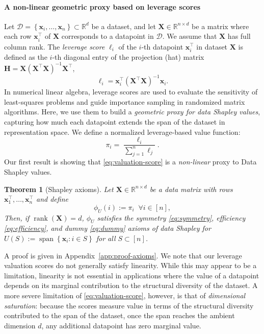 \documentclass{article}
\newtheorem{theorem}{Theorem}
\def\hmat{\mathbf{H}}
\def\xmat{\mathbf{X}}
\def\x{\mathbf{x}}
\def\dataset{\mathcal{D}}
\newcommand{\1}{\mathbbm{1}}
\DeclareMathOperator{\rank}{rank}
\DeclareMathOperator{\spanop}{span}
\begin{document}
\paragraph{A non-linear geometric proxy based on leverage scores}
Let $\dataset = \left\{ \x_i, \dots, \x_n \right\} \subset \mathbb{R}^d$ be a dataset, and let $\xmat \in \mathbb{R}^{n \times d}$ be a matrix where each row $\x_i^\top$ of $\xmat$ corresponds to a datapoint in $\dataset$. 
%
We assume that $\xmat$ has full column rank.
%
The \emph{leverage score} $\ell_i$ of the $i$-th datapoint $\x_i^\top$ in dataset $\xmat$ is defined as the $i$-th diagonal entry of the projection (hat) matrix $\hmat = \xmat(\xmat^\top \xmat)^{-1}\xmat^\top$,
%
\begin{equation}
    \label{eq:leverage-score}
    \ell_i = \x_i^\top (\xmat^\top \xmat)^{-1} \x_i.
\end{equation}
%
In numerical linear algebra, leverage scores are used to evaluate the sensitivity of least-squares problems and guide importance sampling in randomized matrix algorithms.
%
Here, we use them to build a \emph{geometric proxy for data Shapley values}, capturing how much each datapoint extends the span of the dataset in representation space.
%
We define a normalized leverage-based value function:
%
\begin{equation}
    \label{eq:valuation-score}
    \pi_i = \frac{\ell_i}{\sum_{j=1}^n \ell_j}.
\end{equation}
%
Our first result is showing that \eqref{eq:valuation-score} is a {\em non-linear} proxy to Data Shapley values.
%

\begin{theorem}[Shapley axioms]
    \label{th:axioms}
    Let $\xmat \in \mathbb{R}^{n \times d}$ be a data matrix with rows $\x_1^\top, \dots, \x_n^\top$ and define
    \begin{equation}
        \phi_U(i) := \pi_i \;\;\forall i \in [n],
    \end{equation}
%
    Then, if $\rank(\xmat) = d$, $\phi_U$ satisfies the symmetry \eqref{eq:symmetry}, efficiency \eqref{eq:efficiency}, and dummy \eqref{eq:dummy} axioms of data Shapley for $U(S) := \spanop\left\{ \x_i : i \in S\right\}$ for all  $S \subset [n]$.
\end{theorem}

A proof is given in Appendix~\ref{app:proof-axioms}.
%
We note that our leverage valuation scores do not generally satisfy linearity.
%
While this may appear to be a limitation, linearity is not essential in applications where the value of a datapoint depends on its marginal contribution to the structural diversity of the dataset.
%
A more severe limitation of \eqref{eq:valuation-score}, however, is that of \emph{dimensional saturation}: because the scores measure value in terms of the structural diversity contributed to the span of the dataset, once the span reaches the ambient dimension $d$, any additional datapoint has zero marginal value.
\end{document}
